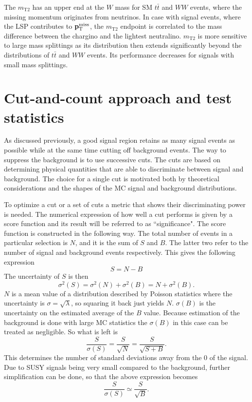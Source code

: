 The $m_{\text{T2}}$ has an upper end at the $W$ mass for SM $t\bar{t}$ and $WW$ events, where the missing momentum originates from neutrinos. In case with signal events, where the LSP contributes to $ \mathbf{p}_{\text T}^{\text{miss}}$, the $m_{\text{T2}}$ endpoint is correlated to the mass difference between the chargino and the lightest neutralino. $m_{\text{T2}}$ is more sensitive to large mass splittings as its distribution then extends significantly beyond the distributions of $t\bar{t}$ and $WW$ events. Its performance decreases for signals with small mass splittings.  

\section{Cut-and-count approach and test statistics}
\label{subsec:stat}
As discussed previously, a good signal region retains as many signal events as possible while at the same time cutting off background events. The way to suppress the background is to use successive cuts. The cuts are based on determining physical quantities that are able to discriminate between signal and background. The choice for a single cut is motivated both by theoretical considerations and the shapes of the MC signal and background distributions. 

To optimize a cut or a set of cuts a metric that shows their discriminating power is needed. The numerical expression of how well a cut performs is given by a score function and its result will be referred to as ``significance". The score function is constructed in the following way.
The total number of events in a particular selection is $N$, and it is the sum of $S$ and $B$. The latter two refer to the number of signal and background events respectively. This gives the following expression
\begin{equation}
S = N -B
\end{equation}
The uncertainty of $S$ is then
\begin{equation}
\sigma^2(S) = \sigma^2(N) + \sigma^2(B) = N+\sigma^2(B).
\end{equation}
$N$ is a mean value of a distribution described by Poisson statistics where the uncertainty is $\sigma = \sqrt{\lambda}$, so squaring it back just yields $N$. 
$\sigma(B)$ is the uncertainty on the estimated average of the $B$ value. 
Because estimation of the background is done with large MC statistics the $\sigma(B)$ in this case can be treated as negligible. So what is left is
\begin{equation}
\frac{S}{\sigma(S)} = \frac{S}{\sqrt{N}} = \frac{S}{\sqrt{S+B}}.
\end{equation}
This determines the number of standard deviations away from the 0 of the signal. Due to SUSY signals being very small compared to the background, further simplification can be done, so that the above expression becomes
\begin{equation}
\frac{S}{\sigma(S)}\simeq \frac{S}{\sqrt{B}}.
\end{equation} 

